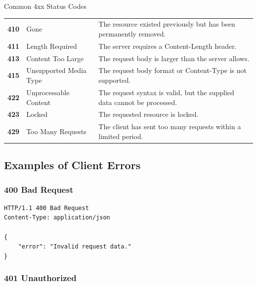 \documentclass[a4paper]{article}
\begin{document}
\begin{statuscategory}{Common 4xx Status Codes}
\begin{longtable}{
                    >{\ttfamily\bfseries}p{1.5cm}
                p{4cm}
                p{8cm}
            }
                410 &
                Gone &
                The resource existed previously but has been permanently removed. \\
                
                411 &
                Length Required &
                The server requires a Content-Length header. \\
                
                413 &
                Content Too Large &
                The request body is larger than the server allows. \\
                
                415 &
                Unsupported Media Type &
                The request body format or Content-Type is not supported. \\
                
                422 &
                Unprocessable Content &
                The request syntax is valid, but the supplied data cannot be processed. \\
                
                423 &
                Locked &
                The requested resource is locked. \\
                
                429 &
                Too Many Requests &
                The client has sent too many requests within a limited period. \\
                \bottomrule
            \end{longtable}
        \end{statuscategory}
        
        \subsection{Examples of Client Errors}
            
            \subsubsection{400 Bad Request}
            
            \begin{verbatim}
HTTP/1.1 400 Bad Request
Content-Type: application/json

{
    "error": "Invalid request data."
}
                \end{verbatim}
            
            \subsubsection{401 Unauthorized}
            
\end{document}
